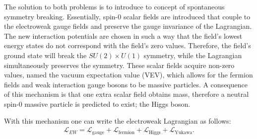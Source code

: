 The solution to both problems is to introduce to concept of spontaneous symmetry breaking. 
Essentially, spin-0 scalar fields are introduced that couple to the electroweak gauge fields and preserve the gauge invariance of the Lagrangian.
The new interaction potentials are chosen in such a way that the field's lowest energy states do not correspond with the field's zero values.
Therefore, the field's ground state will break the $SU(2) \times U(1)$ symmetry, while the Lagrangian simultaneously preserves the symmetry.
These scalar fields acquire non-zero values, named the vacuum expectation value (VEV), which allows for the fermion fields and weak interaction gauge bosons to be massive particles.
A consequence of this mechanism is that one extra scalar field obtains mass, therefore a neutral spin-0 massive particle is predicted to exist; the Higgs boson.

With this mechanism one can write the electroweak Lagrangian as follows:
\begin{align}
\mathcal{L}_{EW} = \mathcal{L}_{\textrm{gauge}} + \mathcal{L}_{\textrm{fermion}} + \mathcal{L}_{\textrm{Higgs}} + \mathcal{L}_{\textrm{Yukawa}}.
\end{align}

